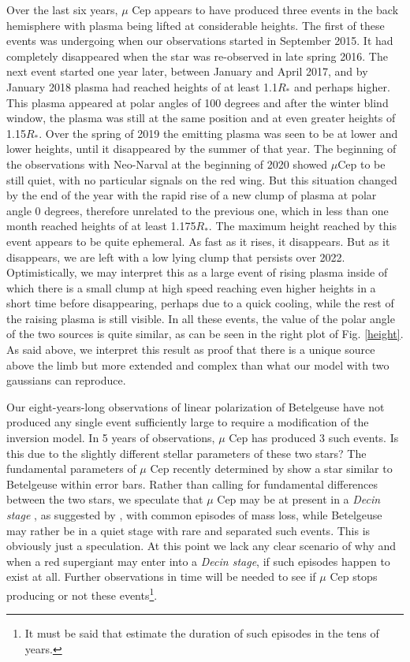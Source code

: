 \documentclass{/Users/art2/TeX/aanda/aa}
\begin{document}
Over the last six years, $\mu$ Cep appears to have produced three events in the back hemisphere with plasma being lifted at considerable heights. The first of these events was undergoing when our observations started in September 2015. It had completely disappeared when the star was re-observed in late spring 2016. The next event started one year later, between January and April 2017, and by January 2018 plasma had reached heights of  at least 1.1$R_*$ and perhaps higher. This plasma appeared at polar angles of 100 degrees and after the winter blind window, the plasma was still at the same position and at even greater heights of 1.15$R_*$. Over the spring of 2019 the emitting plasma was seen to be at lower and lower heights, until it disappeared by the summer of that year.  The beginning of the observations with Neo-Narval  at the beginning of  2020 showed $\mu$Cep to be still quiet, with no particular signals on the red wing. But this situation changed  by the end of the year with the rapid rise of a new clump of plasma at polar angle 0 degrees, therefore unrelated to the previous one, which in less than one month reached heights of at least 1.175$R_*$. The maximum height reached by this event appears to be quite ephemeral. As fast as it rises, it disappears. But as it disappears, we are left with a low  lying clump that persists over 2022. Optimistically, we may interpret this as a large event of rising plasma inside of which there is a small clump at high speed reaching even higher heights in a short time before disappearing, perhaps due to a quick cooling, while the rest of the raising plasma is still visible.  In all these events, the value of the polar angle of the two sources is quite similar, as can be seen in the right plot of Fig. \ref{height}. As said above, we interpret this result as proof that there is a unique source above the limb but more extended and complex than what our model with two gaussians can reproduce. 

Our eight-years-long observations of linear polarization of Betelgeuse have not produced any single event sufficiently large to require a modification of the inversion model. In 5 years of observations, $\mu$ Cep  has produced 3 such events. Is this due to the slightly different stellar parameters of these two stars? The fundamental parameters of $\mu$ Cep recently determined by \cite{montarges_noema_2019} show a star similar to Betelgeuse within  error bars. Rather than calling for fundamental differences between the two stars, we speculate that $\mu$ Cep may be at present in a \textit{Decin stage} \citep{decin_probing_2006}, as suggested by  \cite{montarges_noema_2019}, with common episodes of mass loss, while Betelgeuse may rather be in a quiet stage with rare and separated such events. This is obviously just a speculation. At this point we lack any clear scenario of why and when a red supergiant may enter into a \textit{Decin stage}, if such episodes happen to exist at all. Further observations in time will be needed  to see if $\mu$ Cep stops producing or not these events\footnote{It must be said that    \cite{decin_probing_2006} estimate the duration of such episodes in the tens of years.}. 
\end{document}
